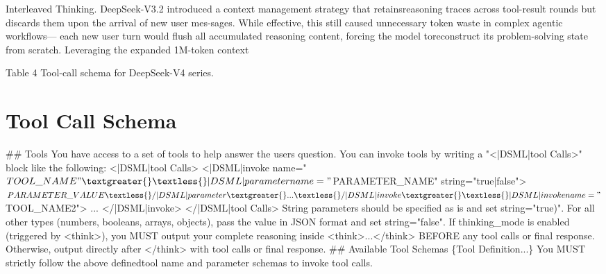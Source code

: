 \documentclass[
  10
]{article}
\newenvironment{Shaded}{}{}
\newcommand{\NormalTok}[1]{#1}
\begin{document}
Interleaved Thinking. DeepSeek-V3.2 introduced a context management
strategy that retainsreasoning traces across tool-result rounds but
discards them upon the arrival of new user mes-sages. While effective,
this still caused unnecessary token waste in complex agentic
workflows--- each new user turn would flush all accumulated reasoning
content, forcing the model toreconstruct its problem-solving state from
scratch. Leveraging the expanded 1M-token context

Table 4 \textbar{} Tool-call schema for DeepSeek-V4 series.

\section{Tool Call Schema}\label{tool-call-schema}

\begin{Shaded}
\begin{Highlighting}[]
\NormalTok{\#\# Tools}
\NormalTok{You have access to a set of tools to help answer the user\textquotesingle{}s question. You can invoke tools by writing a "\textless{}|DSML|tool Calls\textgreater{}" block like the following:}
\NormalTok{\textless{}|DSML|tool Calls\textgreater{}}
\NormalTok{\textless{}|DSML|invoke name="$TOOL\_NAME"\textgreater{}}
\NormalTok{\textless{}|DSML|parameter name="$PARAMETER\_NAME" string="true|false"\textgreater{}$PARAMETER\_VALUE \textless{}/|DSML|parameter\textgreater{}}
\NormalTok{...}
\NormalTok{\textless{}/|DSML|invoke\textgreater{}}
\NormalTok{\textless{}|DSML|invoke name="$TOOL\_NAME2"\textgreater{}}
\NormalTok{...}
\NormalTok{\textless{}/|DSML|invoke\textgreater{}}
\NormalTok{\textless{}/|DSML|tool Calls\textgreater{}}
\NormalTok{String parameters should be specified as is and set \textquotesingle{}string="true)". For all other types (numbers, booleans, arrays, objects), pass the value in JSON format and set \textquotesingle{}string="false"\textquotesingle{}. If thinking\_mode is enabled (triggered by \textless{}think\textgreater{}), you MUST output your complete reasoning inside \textless{}think\textgreater{}...\textless{}/think\textgreater{} BEFORE any tool calls or final response.}
\NormalTok{Otherwise, output directly after \textless{}/think\textgreater{} with tool calls or final response.}
\NormalTok{\#\# Available Tool Schemas}
\NormalTok{\{Tool Definition...\}}
\NormalTok{You MUST strictly follow the above definedtool name and parameter schemas to invoke tool calls.}
\end{Highlighting}
\end{Shaded}
\end{document}
